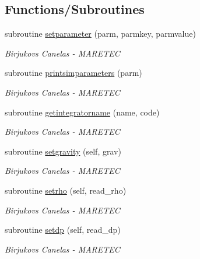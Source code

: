 \subsection*{Functions/\+Subroutines}
\begin{DoxyCompactItemize}
\item 
subroutine \mbox{\hyperlink{namespacesimulation__globals_a541b7227b2876577661cf199d4e7a890}{setparameter}} (parm, parmkey, parmvalue)
\begin{DoxyCompactList}\small\item\em Birjukovs Canelas -\/ M\+A\+R\+E\+T\+EC \end{DoxyCompactList}\item 
subroutine \mbox{\hyperlink{namespacesimulation__globals_aab481887940af0d76b2d7aa844382faa}{printsimparameters}} (parm)
\begin{DoxyCompactList}\small\item\em Birjukovs Canelas -\/ M\+A\+R\+E\+T\+EC \end{DoxyCompactList}\item 
subroutine \mbox{\hyperlink{namespacesimulation__globals_a2c6bf88542c503d1da58280ab3dcf772}{getintegratorname}} (name, code)
\begin{DoxyCompactList}\small\item\em Birjukovs Canelas -\/ M\+A\+R\+E\+T\+EC \end{DoxyCompactList}\item 
subroutine \mbox{\hyperlink{namespacesimulation__globals_ac655f60155581a71b312f3c1a8c87db2}{setgravity}} (self, grav)
\begin{DoxyCompactList}\small\item\em Birjukovs Canelas -\/ M\+A\+R\+E\+T\+EC \end{DoxyCompactList}\item 
subroutine \mbox{\hyperlink{namespacesimulation__globals_acfdc640757f0275bccb1d8de7bd7dc92}{setrho}} (self, read\+\_\+rho)
\begin{DoxyCompactList}\small\item\em Birjukovs Canelas -\/ M\+A\+R\+E\+T\+EC \end{DoxyCompactList}\item 
subroutine \mbox{\hyperlink{namespacesimulation__globals_a9a8e88c06937b7cf6be9d9bf30f54ba9}{setdp}} (self, read\+\_\+dp)
\begin{DoxyCompactList}\small\item\em Birjukovs Canelas -\/ M\+A\+R\+E\+T\+EC \end{DoxyCompactList}\item 

\end{DoxyCompactItemize}
